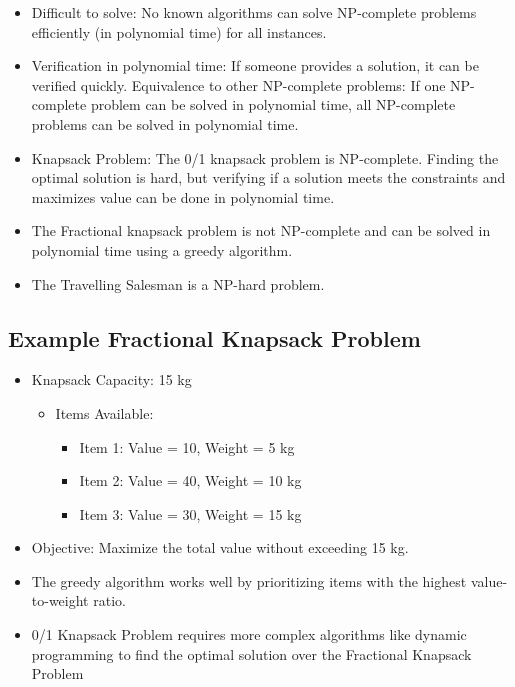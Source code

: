 \documentclass[
  letterpaper,
  DIV=11,
  numbers=noendperiod]{scrreprt}
\providecommand{\tightlist}{%
  \setlength{\itemsep}{0pt}\setlength{\parskip}{0pt}}\usepackage{longtable,booktabs,array}
\begin{document}
\begin{itemize}
\item
  Difficult to solve: No known algorithms can solve NP-complete problems
  efficiently (in polynomial time) for all instances.
\item
  Verification in polynomial time: If someone provides a solution, it
  can be verified quickly. Equivalence to other NP-complete problems: If
  one NP-complete problem can be solved in polynomial time, all
  NP-complete problems can be solved in polynomial time.
\item
  Knapsack Problem: The 0/1 knapsack problem is NP-complete. Finding the
  optimal solution is hard, but verifying if a solution meets the
  constraints and maximizes value can be done in polynomial time.
\item
  The Fractional knapsack problem is not NP-complete and can be solved
  in polynomial time using a greedy algorithm.
\item
  The Travelling Salesman is a NP-hard problem.
\end{itemize}

\subsection{Example Fractional Knapsack
Problem}\label{example-fractional-knapsack-problem}

\begin{itemize}
\item
  Knapsack Capacity: 15 kg

  \begin{itemize}
  \tightlist
  \item
    Items Available:

    \begin{itemize}
    \tightlist
    \item
      Item 1: Value = 10, Weight = 5 kg
    \item
      Item 2: Value = 40, Weight = 10 kg
    \item
      Item 3: Value = 30, Weight = 15 kg
    \end{itemize}
  \end{itemize}
\item
  Objective: Maximize the total value without exceeding 15 kg.
\item
  The greedy algorithm works well by prioritizing items with the highest
  value-to-weight ratio.
\item
  0/1 Knapsack Problem requires more complex algorithms like dynamic
  programming to find the optimal solution over the Fractional Knapsack
  Problem
\end{itemize}
\end{document}
